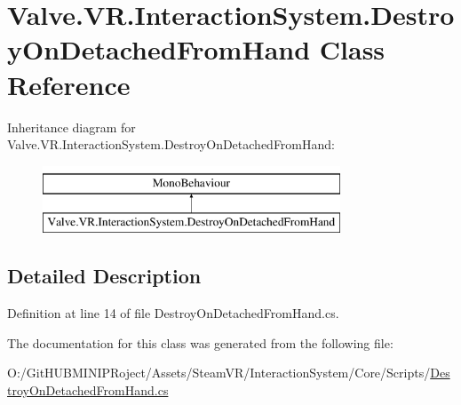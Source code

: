 \hypertarget{class_valve_1_1_v_r_1_1_interaction_system_1_1_destroy_on_detached_from_hand}{}\section{Valve.\+V\+R.\+Interaction\+System.\+Destroy\+On\+Detached\+From\+Hand Class Reference}
\label{class_valve_1_1_v_r_1_1_interaction_system_1_1_destroy_on_detached_from_hand}
Inheritance diagram for Valve.\+V\+R.\+Interaction\+System.\+Destroy\+On\+Detached\+From\+Hand\+:\begin{figure}[H]
\begin{center}
\leavevmode
\includegraphics[height=2.000000cm]{class_valve_1_1_v_r_1_1_interaction_system_1_1_destroy_on_detached_from_hand}
\end{center}
\end{figure}


\subsection{Detailed Description}


Definition at line 14 of file Destroy\+On\+Detached\+From\+Hand.\+cs.



The documentation for this class was generated from the following file\+:\begin{DoxyCompactItemize}
\item 
O\+:/\+Git\+H\+U\+B\+M\+I\+N\+I\+P\+Roject/\+Assets/\+Steam\+V\+R/\+Interaction\+System/\+Core/\+Scripts/\mbox{\hyperlink{_destroy_on_detached_from_hand_8cs}{Destroy\+On\+Detached\+From\+Hand.\+cs}}\end{DoxyCompactItemize}
